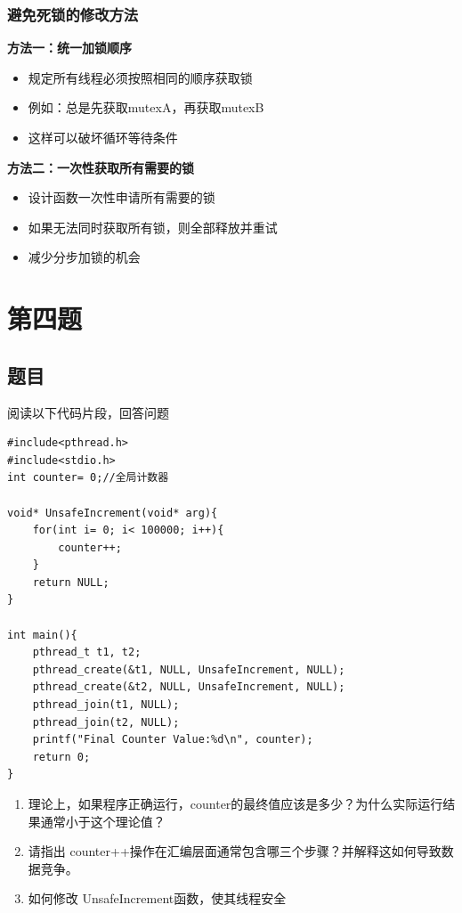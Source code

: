 \subsection{避免死锁的修改方法}

\textbf{方法一：统一加锁顺序}
\begin{itemize}
    \item 规定所有线程必须按照相同的顺序获取锁
    \item 例如：总是先获取mutexA，再获取mutexB
    \item 这样可以破坏循环等待条件
\end{itemize}

\textbf{方法二：一次性获取所有需要的锁}
\begin{itemize}
    \item 设计函数一次性申请所有需要的锁
    \item 如果无法同时获取所有锁，则全部释放并重试
    \item 减少分步加锁的机会
\end{itemize}

\chapter{第四题}

\section{题目}

阅读以下代码片段，回答问题
\begin{lstlisting}[style=cleancpp]
#include<pthread.h> 
#include<stdio.h>
int counter= 0;//全局计数器

void* UnsafeIncrement(void* arg){ 
    for(int i= 0; i< 100000; i++){ 
        counter++; 
    } 
    return NULL; 
}

int main(){ 
    pthread_t t1, t2;
    pthread_create(&t1, NULL, UnsafeIncrement, NULL); 
    pthread_create(&t2, NULL, UnsafeIncrement, NULL);
    pthread_join(t1, NULL); 
    pthread_join(t2, NULL);
    printf("Final Counter Value:%d\n", counter); 
    return 0; 
}
\end{lstlisting}

\begin{enumerate}
    \item 理论上，如果程序正确运行，counter的最终值应该是多少？为什么实际运行结果通常小于这个理论值？
    \item 请指出 counter++操作在汇编层面通常包含哪三个步骤？并解释这如何导致数据竞争。
    \item 如何修改 UnsafeIncrement函数，使其线程安全
\end{enumerate}

